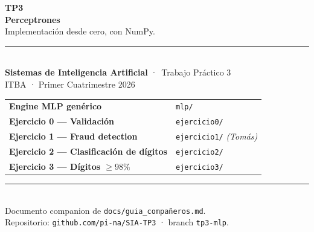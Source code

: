 \documentclass[11pt,a4paper]{article}
\newcommand{\code}[1]{\texttt{\textcolor{accent}{#1}}}
\begin{document}
\begin{titlepage}
\thispagestyle{empty}

\vspace*{3cm}
\begin{flushleft}
{\fontsize{42}{48}\selectfont\bfseries\color{ink}TP3}\\[0.4em]
{\fontsize{32}{38}\selectfont\bfseries\color{accent}Perceptrones}\\[0.6em]
{\Large\color{muted}Implementación desde cero, con NumPy.}\\[2em]

\rule{\linewidth}{0.4pt}\\[0.6em]
{\large\textbf{Sistemas de Inteligencia Artificial} \textcolor{muted}{·}\ Trabajo Práctico 3}\\[0.3em]
{\large\color{muted}ITBA · Primer Cuatrimestre 2026}\\[3em]

\begin{tabular}{@{}ll@{}}
  \large\bfseries Engine MLP genérico & \code{mlp/} \\
  \large\bfseries Ejercicio 0 — Validación & \code{ejercicio0/} \\
  \large\bfseries Ejercicio 1 — Fraud detection & \code{ejercicio1/} \quad\textit{(Tomás)} \\
  \large\bfseries Ejercicio 2 — Clasificación de dígitos & \code{ejercicio2/} \\
  \large\bfseries Ejercicio 3 — Dígitos $\geq 98\%$ & \code{ejercicio3/} \\
\end{tabular}
\end{flushleft}

\vfill
\begin{flushleft}
\rule{\linewidth}{0.4pt}\\[0.4em]
\textcolor{muted}{\small Documento companion de \code{docs/guia\_compañeros.md}.\\
Repositorio: \texttt{github.com/pi-na/SIA-TP3} · branch \texttt{tp3-mlp}.}
\end{flushleft}
\end{titlepage}
\end{document}
